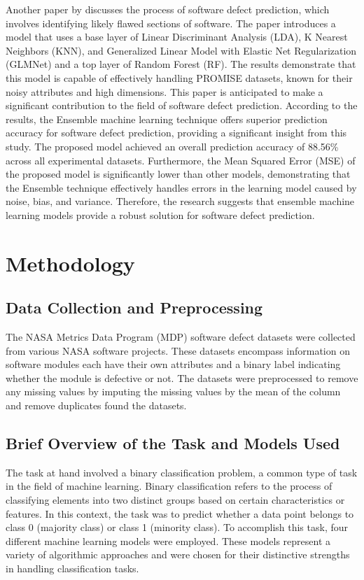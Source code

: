 \documentclass[12pt]{report}
\begin{document}
Another paper by\cite{dada2021ensemble} discusses the process of software
defect prediction, which involves identifying likely flawed sections of
software. The paper introduces a model that uses a base layer of Linear
Discriminant Analysis (LDA), K Nearest Neighbors (KNN), and Generalized Linear
Model with Elastic Net Regularization (GLMNet) and a top layer of Random Forest
(RF). The results demonstrate that this model is capable of effectively
handling PROMISE datasets, known for their noisy attributes and high
dimensions. This paper is anticipated to make a significant contribution to the
field of software defect prediction. According to the results, the Ensemble
machine learning technique offers superior prediction accuracy for software
defect prediction, providing a significant insight from this study. The
proposed model achieved an overall prediction accuracy of 88.56\% across all
experimental datasets. Furthermore, the Mean Squared Error (MSE) of the
proposed model is significantly lower than other models, demonstrating that the
Ensemble technique effectively handles errors in the learning model caused by
noise, bias, and variance. Therefore, the research suggests that ensemble
machine learning models provide a robust solution for software defect
prediction.

\chapter*{Methodology}
\section*{Data Collection and Preprocessing}
The NASA Metrics Data Program (MDP) software defect datasets were collected from
various NASA software projects. These datasets encompass information on software
modules each have their own attributes and a binary label indicating whether the
module is defective or not. The datasets were preprocessed to remove any
missing values by imputing the missing values by the mean of the column
and remove duplicates found the datasets.

\section*{Brief Overview of the Task and Models Used}
The task at hand involved a binary classification problem, a common type of
task in the field of machine learning. Binary classification refers to the
process of classifying elements into two distinct groups based on certain
characteristics or features. In this context, the task was to predict whether a
data point belongs to class 0 (majority class) or class 1 (minority class). To
accomplish this task, four different machine learning models were employed.
These models represent a variety of algorithmic approaches and were chosen for
their distinctive strengths in handling classification tasks.
\end{document}
